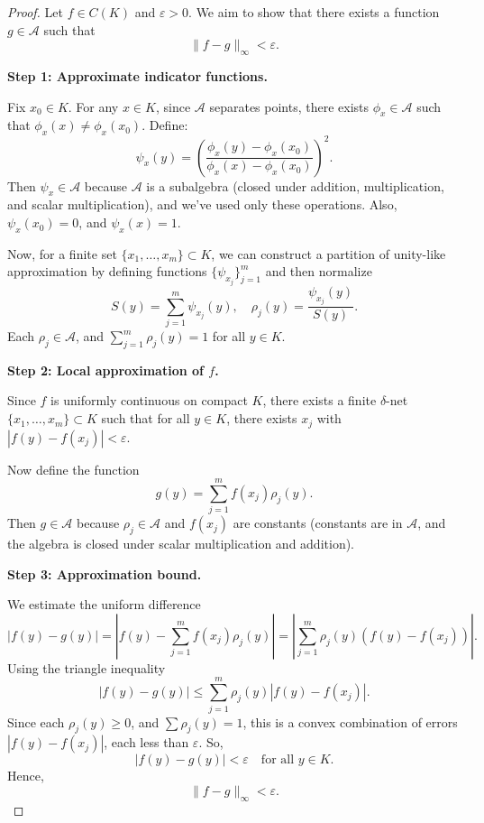 \begin{proof}
Let \( f \in C(K) \) and \( \varepsilon > 0 \). We aim to show that there exists a function \( g \in \mathcal{A} \) such that 
\[
\|f - g\|_\infty < \varepsilon.
\]

\textbf{Step 1: Approximate indicator functions.}

Fix \( x_0 \in K \). For any \( x \in K \), since \( \mathcal{A} \) separates points, there exists \( \phi_x \in \mathcal{A} \) such that \( \phi_x(x) \neq \phi_x(x_0) \). Define:
\[
\psi_x(y) = \left( \frac{\phi_x(y) - \phi_x(x_0)}{\phi_x(x) - \phi_x(x_0)} \right)^2.
\]
Then \( \psi_x \in \mathcal{A} \) because \( \mathcal{A} \) is a subalgebra (closed under addition, multiplication, and scalar multiplication), and we’ve used only these operations. Also, \( \psi_x(x_0) = 0 \), and \( \psi_x(x) = 1 \).

Now, for a finite set \( \{x_1, \dots, x_m\} \subset K \), we can construct a partition of unity-like approximation by defining functions \( \{\psi_{x_j}\}_{j=1}^m \) and then normalize
\[
S(y) = \sum_{j=1}^m \psi_{x_j}(y), \quad \rho_j(y) = \frac{\psi_{x_j}(y)}{S(y)}.
\]
Each \( \rho_j \in \mathcal{A} \), and \( \sum_{j=1}^m \rho_j(y) = 1 \) for all \( y \in K \).

\textbf{Step 2: Local approximation of \( f \).}

Since \( f \) is uniformly continuous on compact \( K \), there exists a finite \( \delta \)-net \( \{x_1, \dots, x_m\} \subset K \) such that for all \( y \in K \), there exists \( x_j \) with \( |f(y) - f(x_j)| < \varepsilon \). 

Now define the function
\[
g(y) = \sum_{j=1}^m f(x_j) \rho_j(y).
\]
Then \( g \in \mathcal{A} \) because \( \rho_j \in \mathcal{A} \) and \( f(x_j) \) are constants (constants are in \( \mathcal{A} \), and the algebra is closed under scalar multiplication and addition).

\textbf{Step 3: Approximation bound.}

We estimate the uniform difference
\[
|f(y) - g(y)| = \left|f(y) - \sum_{j=1}^m f(x_j) \rho_j(y)\right| = \left|\sum_{j=1}^m \rho_j(y) (f(y) - f(x_j))\right|.
\]
Using the triangle inequality
\[
|f(y) - g(y)| \leq \sum_{j=1}^m \rho_j(y) |f(y) - f(x_j)|.
\]
Since each \( \rho_j(y) \geq 0 \), and \( \sum \rho_j(y) = 1 \), this is a convex combination of errors \( |f(y) - f(x_j)| \), each less than \( \varepsilon \). So,
\[
|f(y) - g(y)| < \varepsilon \quad \text{for all } y \in K.
\]
Hence,
\[
\|f - g\|_\infty < \varepsilon.
\]
\end{proof}

